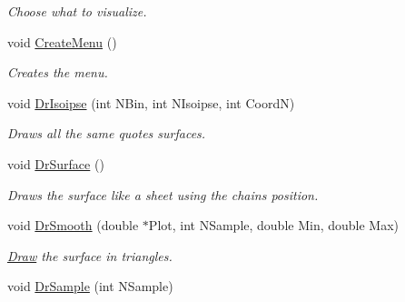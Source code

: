 \begin{DoxyCompactItemize}
\begin{DoxyCompactList}\small\item\em \-Choose what to visualize. \end{DoxyCompactList}\item 
\hypertarget{classElPoly_a8b0db33648473b19696bb19c6282dc81}{void \hyperlink{classElPoly_a8b0db33648473b19696bb19c6282dc81}{\-Create\-Menu} ()}\label{classElPoly_a8b0db33648473b19696bb19c6282dc81}

\begin{DoxyCompactList}\small\item\em \-Creates the menu. \end{DoxyCompactList}\item 
\hypertarget{classElPoly_a145b3b6aa1385444c9ea75dd93b94111}{void \hyperlink{classElPoly_a145b3b6aa1385444c9ea75dd93b94111}{\-Dr\-Isoipse} (int \-N\-Bin, int \-N\-Isoipse, int \-Coord\-N)}\label{classElPoly_a145b3b6aa1385444c9ea75dd93b94111}

\begin{DoxyCompactList}\small\item\em \-Draws all the same quotes surfaces. \end{DoxyCompactList}\item 
\hypertarget{classElPoly_a892423f6e9f004d290645c0aefa7caee}{void \hyperlink{classElPoly_a892423f6e9f004d290645c0aefa7caee}{\-Dr\-Surface} ()}\label{classElPoly_a892423f6e9f004d290645c0aefa7caee}

\begin{DoxyCompactList}\small\item\em \-Draws the surface like a sheet using the chains position. \end{DoxyCompactList}\item 
\hypertarget{classElPoly_a7681bc74a114ac4d7c4503a9dc39e957}{void \hyperlink{classElPoly_a7681bc74a114ac4d7c4503a9dc39e957}{\-Dr\-Smooth} (double $\ast$\-Plot, int \-N\-Sample, double \-Min, double \-Max)}\label{classElPoly_a7681bc74a114ac4d7c4503a9dc39e957}

\begin{DoxyCompactList}\small\item\em \hyperlink{classDraw}{\-Draw} the surface in triangles. \end{DoxyCompactList}\item 
\hypertarget{classElPoly_a8a67d62cbd0dd7489e799e2f7871fb74}{void \hyperlink{classElPoly_a8a67d62cbd0dd7489e799e2f7871fb74}{\-Dr\-Sample} (int \-N\-Sample)}\label{classElPoly_a8a67d62cbd0dd7489e799e2f7871fb74}


\end{DoxyCompactItemize}
